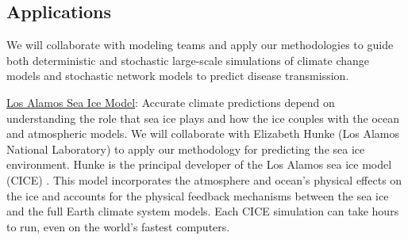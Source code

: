 \documentclass[11pt]{NSFamsart}
\newcommand{\Upara}[1]{\noindent\underline{\upshape #1}:}
\newcommand{\POIs}{\hyperlink{POIlink}{POIs}\xspace}
\begin{document}
\subsection{Applications} \label{sec:Applications}

We will collaborate with modeling teams and apply our methodologies to guide both deterministic and stochastic large-scale simulations of climate change models and stochastic network models to predict disease transmission. 


\Upara{Los Alamos Sea Ice Model}
Accurate climate predictions depend on understanding the role that sea ice plays and how the ice couples with the ocean and atmospheric models.
We will collaborate with Elizabeth Hunke (Los Alamos National Laboratory) to apply our methodology for predicting the sea ice environment. Hunke is the principal developer of the Los Alamos sea ice model (CICE) \cite{hunke2017cice, hunke2010cice}. 
This model incorporates the atmosphere and ocean's physical effects on the ice and accounts for the physical feedback mechanisms between the sea ice and the full Earth climate system models. Each CICE simulation can take hours to run, even on the world's fastest computers.
\end{document}
